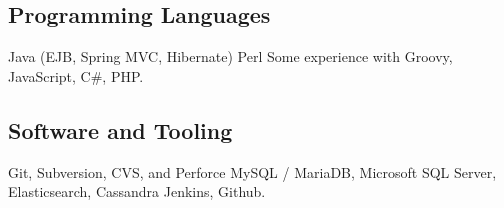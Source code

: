 \documentclass[11pt,letterpaper,roman]{moderncv} %
\begin{document}
\subsection{Programming Languages}

								{Java (EJB, Spring MVC, Hibernate)}
									{Perl}
						{Some experience with Groovy, JavaScript, C\#, PHP.}

\subsection{Software and Tooling}

															{Git, Subversion, CVS, and Perforce}
													{MySQL / MariaDB, Microsoft SQL Server, Elasticsearch, Cassandra}
		{Jenkins, Github.}
\end{document}
